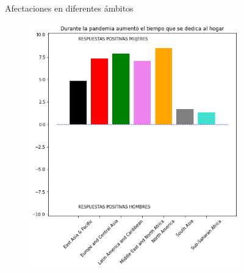 \documentclass[12pt]{article}
\begin{document}
\begin{figure}
\begin{subfigure}[b]{0.45\textwidth}
         \caption{}
         \label{fig:224}
     \end{subfigure}
        \caption{Afectaciones en diferentes ámbitos}
        \label{fig:22_1}
\end{figure}
\begin{figure}
     \centering
     \begin{subfigure}[b]{0.45\textwidth}
         \centering
         \includegraphics[width=\textwidth]{images/225.png}
         \caption{}
         \label{fig:225}
     \end{subfigure}
     \hfill
     \begin{subfigure}[b]{0.45\textwidth}
         \centering

\end{subfigure}
\end{figure}
\end{document}
